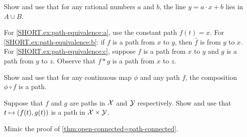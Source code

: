 \begin{multicols}{2}
Show and use that for any rational numbers $a$ and $b$, the line $y=a\cdot x+b$ lies in $A\cup B$.

 For \ref{SHORT.ex:path-equivalence:a}, use the constant path $f(t)=x$.
For \ref{SHORT.ex:path-equivalence:b}: if $f$ is a path from $x$ to $y$, then $\bar f$ is from $y$ to $x$.
For \ref{SHORT.ex:path-equivalence:c}, suppose $f$ is a path from $x$ to $y$ and $g$ is a path from $y$ to $z$.
Observe that $f*g$ is a path from $x$ to $z$.


Show and use that for any continuous map $\phi$ and any path $f$, the composition $\phi\circ f$ is a path. 

Suppose that $f$ and $g$ are paths in $\mathcal{X}$ and $\mathcal{Y}$ respectively.
Show and use that $t\z\mapsto (f(t),g(t))$ is a path in $\mathcal{X}\times\mathcal{Y}$.

 Mimic the proof of \ref{thm:open-connected=path-connected}.


\end{multicols}
